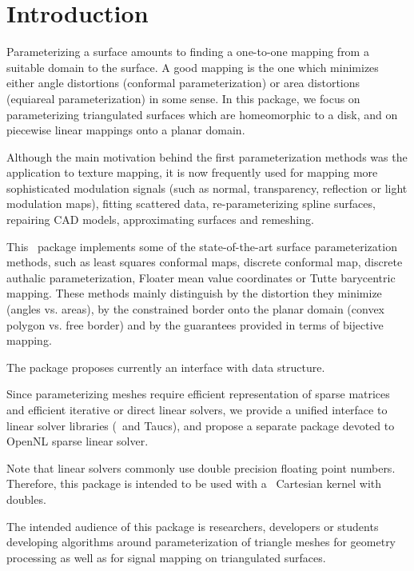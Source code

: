 \section{Introduction}

Parameterizing a surface amounts to finding a one-to-one mapping from
a suitable domain to the surface. A good mapping is the one which
minimizes either angle distortions (conformal parameterization) or
area distortions (equiareal parameterization) in some sense.  In this
package, we focus on parameterizing triangulated surfaces which are
homeomorphic to a disk, and on piecewise linear mappings onto a planar
domain.

Although the main motivation behind the first parameterization methods
was the application to texture mapping, it is now frequently used for
mapping more sophisticated modulation signals (such as normal,
transparency, reflection or light modulation maps), fitting scattered
data, re-parameterizing spline surfaces, repairing CAD models,
approximating surfaces and remeshing.

This \cgal\ package implements some of the state-of-the-art
surface parameterization methods, such as least squares conformal maps,
discrete conformal map, discrete authalic
parameterization, Floater mean value coordinates or Tutte barycentric
mapping. These methods mainly distinguish by the distortion they
minimize (angles vs. areas), by the constrained border onto the
planar domain (convex polygon vs. free border) and by the guarantees
provided in terms of bijective mapping.

The package proposes currently an interface with 
data structure.

Since parameterizing meshes require efficient representation of sparse
matrices and efficient iterative or direct linear solvers, we provide
a unified interface to linear solver libraries (\eigen\ and {\sc Taucs}),
and propose a separate package devoted to OpenNL sparse
linear solver.

Note that linear solvers commonly use double precision floating point
numbers. Therefore, this package is intended to be used with a \cgal\
Cartesian kernel with doubles.

The intended audience of this package is researchers, developers or
students developing algorithms around parameterization of triangle
meshes for geometry processing as well as for signal mapping on
triangulated surfaces.

